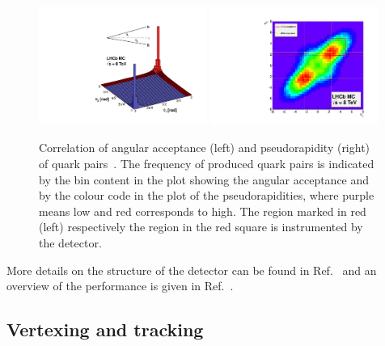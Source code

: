 \begin{figure}[htb]
\centering
\includegraphics[width=0.49\textwidth]{04-Detector/figs/bbbarcorrelation.pdf}
\includegraphics[width=0.49\textwidth]{04-Detector/figs/bbbaracceptance.pdf}
\caption{Correlation of angular acceptance (left) and pseudorapidity (right)
of \bbbar quark pairs~\cite{LHCb-Technical-Proposal}. The frequency of
produced \bbbar quark pairs is indicated by the bin content in the plot
showing the angular acceptance and by the colour code in the plot of the
pseudorapidities, where purple means low and red corresponds to high. The
region marked in red (left) respectively the region in the red square is
instrumented by the \lhcb detector.}
\label{fig:detector:bbbar}
\end{figure}

More details on the structure of the \lhcb detector can be found in
Ref.~\cite{Alves:2008zz} and an overview of the performance is given in
Ref.~\cite{LHCb-DP-2014-002}.

\subsection*{Vertexing and tracking}
\label{subsec:tracker}

